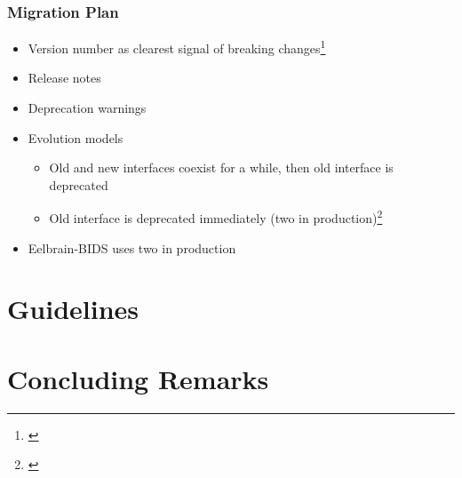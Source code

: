\documentclass{beamer}
\begin{document}
\begin{frame}

\frametitle{Migration Plan}

\begin{itemize}

\item Version number as clearest signal of breaking changes\footnote{\citet{preston-werner}}
\item Release notes
\item Deprecation warnings
\item Evolution models
\begin{itemize}
  \item Old and new interfaces coexist for a while, then old interface is deprecated
  \item Old interface is deprecated immediately (two in production)\footnote{\citet{LubkeEtAl2019}}
\end{itemize}
\item Eelbrain-BIDS uses two in production
\end{itemize}



\end{frame}


\section[Guidelines]{Guidelines}


\section[Concluding Remarks]{Concluding Remarks}
\end{document}
